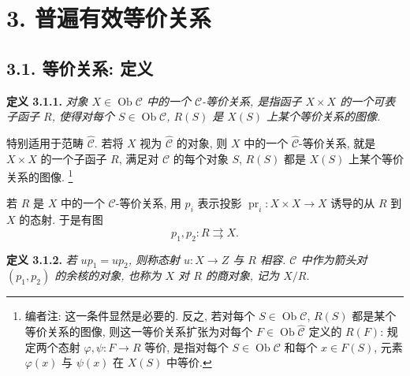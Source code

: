 
\setcounter{footnote}{9}

\section*{3. 普遍有效等价关系}

\subsection*{3.1. 等价关系: 定义}

\noindent{}\textbf{定义 3.1.1.}
\textit{对象 \(X\in\operatorname{Ob}\mathscr C\) 中的一个
\(\mathscr C\)-等价关系, 是指函子 \(X\times X\) 的一个可表子函子
\(R\), 使得对每个 \(S\in\operatorname{Ob}\mathscr C\),
\(R(S)\) 是 \(X(S)\) 上某个等价关系的图像.}

特别适用于范畴
\(\widehat{\mathscr C}\). 若将 \(X\) 视为 \(\widehat{\mathscr C}\)
的对象, 则 \(X\) 中的一个 \(\widehat{\mathscr C}\)-等价关系,
就是 \(X\times X\) 的一个子函子 \(R\), 满足对
\(\mathscr C\) 的每个对象 \(S\), \(R(S)\) 都是 \(X(S)\)
上某个等价关系的图像.
\footnote{编者注: 这一条件显然是必要的. 反之, 若对每个
\(S\in\operatorname{Ob}\mathscr C\), \(R(S)\) 都是某个等价关系的图像,
则这一等价关系扩张为对每个 \(F\in\operatorname{Ob}\widehat{\mathscr C}\)
定义的 \(R(F)\): 规定两个态射 \(\varphi,\psi:F\to R\) 等价,
是指对每个 \(S\in\operatorname{Ob}\mathscr C\) 和每个 \(x\in F(S)\),
元素 \(\varphi(x)\) 与 \(\psi(x)\) 在 \(X(S)\) 中等价.}

若 \(R\) 是 \(X\) 中的一个 \(\mathscr C\)-等价关系,
用 \(p_i\) 表示投影 \(\operatorname{pr}_i:X\times X\to X\)
诱导的从 \(R\) 到 \(X\) 的态射. 于是有图
\[
  p_1,p_2:R\rightrightarrows X.
\]

\medskip
\noindent{}\textbf{定义 3.1.2.}
\textit{若 \(up_1=up_2\), 则称态射 \(u:X\to Z\)
\emph{与 \(R\) 相容}. \(\mathscr C\) 中作为箭头对 \((p_1,p_2)\)
的余核的对象, 也称为 \(X\) 对 \(R\) 的\emph{商对象},
记为 \(X/R\).}

